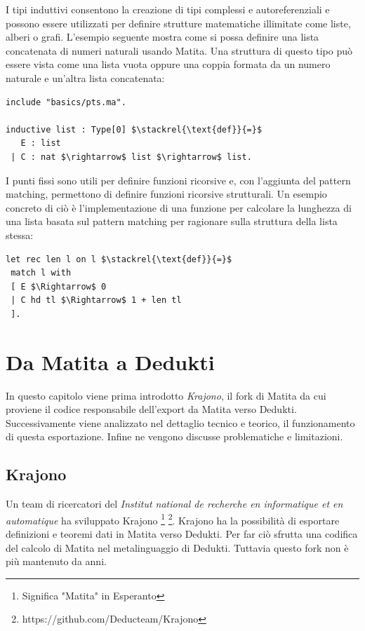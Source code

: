 \documentclass[12pt,a4paper]{mimosis}
\begin{document}
I tipi induttivi consentono la creazione di tipi complessi e autoreferenziali e possono
essere utilizzati per definire strutture matematiche illimitate come liste,
alberi o grafi. L'esempio seguente mostra come si possa definire una lista concatenata
di numeri naturali usando Matita. Una struttura di questo tipo può essere vista come
una lista vuota oppure una coppia formata da un numero naturale e un'altra lista 
concatenata:

\begin{lstlisting}[mathescape]
include "basics/pts.ma".

inductive list : Type[0] $\stackrel{\text{def}}{=}$
   E : list
 | C : nat $\rightarrow$ list $\rightarrow$ list.

\end{lstlisting}

I punti fissi sono utili per definire funzioni ricorsive e, con l'aggiunta del
pattern matching, permettono di definire funzioni ricorsive strutturali. Un esempio
concreto di ciò è l'implementazione di una funzione per calcolare la lunghezza
di una lista basata sul pattern matching per ragionare sulla struttura della 
lista stessa:

\begin{lstlisting}
let rec len l on l $\stackrel{\text{def}}{=}$
 match l with
 [ E $\Rightarrow$ 0
 | C hd tl $\Rightarrow$ 1 + len tl
 ].
\end{lstlisting}


\chapter{Da Matita a Dedukti} \label{capitoloExport}
In questo capitolo viene prima introdotto \textit{Krajono}, il fork di Matita
da cui proviene il codice responsabile dell'export da Matita verso Dedukti. 
Successivamente viene analizzato nel dettaglio tecnico e teorico, il funzionamento 
di questa esportazione. Infine ne vengono discusse problematiche e limitazioni.

\section{Krajono}
Un team di ricercatori del \textit{Institut national de recherche en informatique 
et en automatique} ha sviluppato Krajono \footnote{Significa "Matita" in Esperanto}
\footnote{https://github.com/Deducteam/Krajono}. Krajono ha la possibilità
di esportare definizioni e teoremi dati in Matita verso Dedukti. Per far ciò
sfrutta una codifica del calcolo di Matita nel metalinguaggio di Dedukti. 
Tuttavia questo fork non è più mantenuto da anni.
\end{document}
